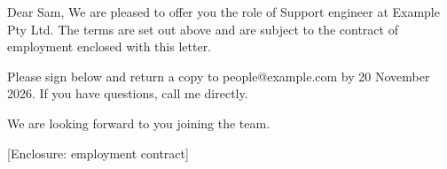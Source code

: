 \documentclass{jupiter-letter}
\begin{document}
\begin{jpletter}{Dear Sam,}
We are pleased to offer you the role of Support engineer at Example Pty Ltd. The terms are set out above and are subject to the contract of employment enclosed with this letter.

Please sign below and return a copy to people@example.com by 20 November 2026. If you have questions, call me directly.

We are looking forward to you joining the team.
\end{jpletter}
[Enclosure: employment contract]
\end{document}
